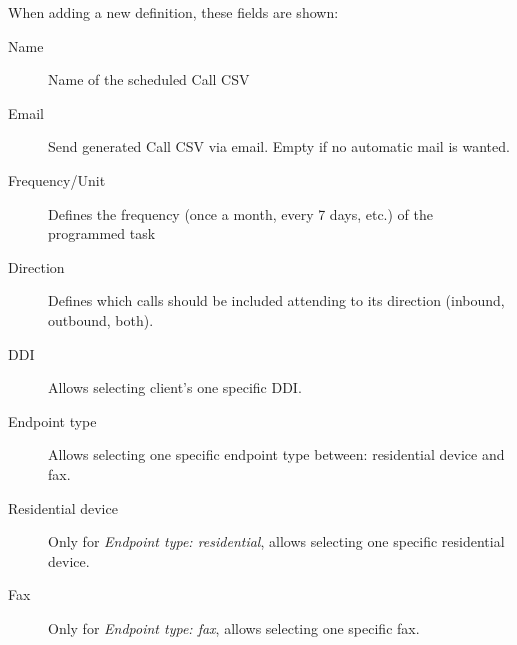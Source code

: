 \documentclass[letterpaper,10pt,spanish]{sphinxmanual}
\begin{document}
When adding a new definition, these fields are shown:
\begin{description}
\item[{Name}] \leavevmode{}\label{administration_portal/client/residential/calls/call_csv_schedulers:term-name}
Name of the scheduled Call CSV

\item[{Email}] \leavevmode{}\label{administration_portal/client/residential/calls/call_csv_schedulers:term-email}
Send generated Call CSV via email. Empty if no automatic mail is wanted.

\item[{Frequency/Unit}] \leavevmode{}\label{administration_portal/client/residential/calls/call_csv_schedulers:term-frequency-unit}
Defines the frequency (once a month, every 7 days, etc.) of the programmed task

\item[{Direction}] \leavevmode{}\label{administration_portal/client/residential/calls/call_csv_schedulers:term-direction}
Defines which calls should be included attending to its direction (inbound, outbound, both).

\item[{DDI}] \leavevmode{}\label{administration_portal/client/residential/calls/call_csv_schedulers:term-ddi}
Allows selecting client's one specific DDI.

\item[{Endpoint type}] \leavevmode{}\label{administration_portal/client/residential/calls/call_csv_schedulers:term-endpoint-type}
Allows selecting one specific endpoint type between: residential device and fax.

\item[{Residential device}] \leavevmode{}\label{administration_portal/client/residential/calls/call_csv_schedulers:term-residential-device}
Only for \emph{Endpoint type: residential}, allows selecting one specific residential device.

\item[{Fax}] \leavevmode{}\label{administration_portal/client/residential/calls/call_csv_schedulers:term-fax}
Only for \emph{Endpoint type: fax}, allows selecting one specific fax.

\end{description}
\end{document}
